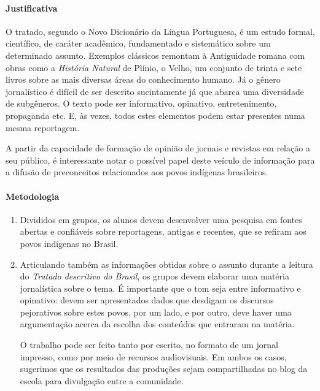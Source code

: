 \documentclass[12pt]{extarticle}
\begin{document}
\paragraph{Justificativa} O tratado, segundo o Novo Dicionário da Língua
Portuguesa, é um estudo formal, científico, de caráter acadêmico, 
fundamentado e sistemático sobre um determinado assunto. Exemplos
clássicos remontam à Antiguidade romana com obras como a \emph{História Natural}
de Plínio, o Velho, um conjunto de trinta e sete livros sobre as
mais diversas áreas do conhecimento humano.
Já o gênero jornalístico é difícil de ser descrito sucintamente
já que abarca uma diversidade de subgêneros. O texto pode ser informativo,
opinativo, entretenimento, propaganda etc. E, às vezes, todos estes 
elementos podem estar presentes numa mesma reportagem. 

A partir da capacidade de formação de opinião de jornais e revistas
em relação a seu público, é interessante notar o possível papel deste
veículo de informação para a difusão de preconceitos relacionados aos
povos indígenas brasileiros. 


\paragraph{Metodologia}
\begin{enumerate}

	\item
	Divididos em grupos, os alunos devem desenvolver uma pesquisa
	em fontes abertas e confiáveis sobre reportagens, antigas e recentes, 
	que se refiram aos povos indígenas no Brasil. 

	\item
	Articulando também as informações obtidas sobre o assunto durante a 
	leitura do \emph{Tratado descritivo do Brasil}, os grupos devem 
	elaborar uma matéria jornalística sobre o tema. É importante que o 
	tom seja entre informativo e opinativo: devem ser apresentados dados 
	que desdigam os discursos pejorativos sobre estes povos, por um lado, 
	e por outro, deve haver uma argumentação acerca da escolha dos 
	conteúdos que entraram na matéria.

	O trabalho pode ser feito tanto por escrito, no formato de um jornal
	impresso, como por meio de recursos audiovisuais. Em ambos os casos,
	sugerimos que os resultados das produções sejam compartilhadas no blog
	da escola para divulgação entre a comunidade. 
\end{enumerate}
\end{document}
